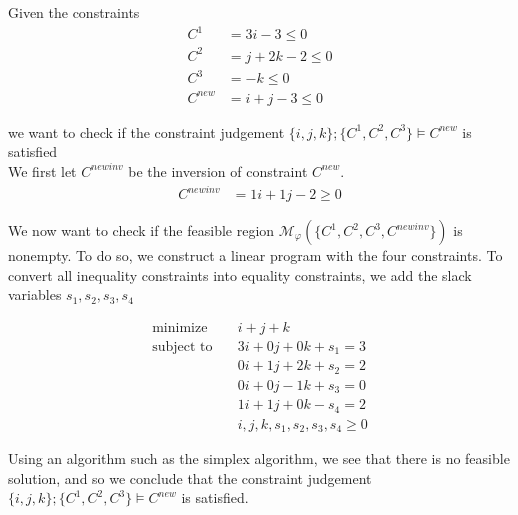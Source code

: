 \begin{example}
    Given the constraints
    \begin{align*}
        C^1 &= 3i - 3 \leq 0\\
        C^2 &= j + 2k - 2 \leq 0\\
        C^3 &= -k \leq 0\\
        C^{new} &= i + j - 3 \leq 0
    \end{align*}
    
    we want to check if the constraint judgement $\{i, j, k\};\{C^1, C^2, C^3\} \vDash C^{new}$ is satisfied\\
    
    
    We first let $C^{newinv}$ be the inversion of constraint $C^{new}$.
    \begin{align*}
        C^{newinv} &= 1i + 1j - 2 \geq 0
    \end{align*}
    
    We now want to check if the feasible region $\mathcal{M}_\varphi(\{C^1, C^2, C^3, C^{newinv}\})$ is nonempty. To do so, we construct a linear program with the four constraints. To convert all inequality constraints into equality constraints, we add the slack variables $s_1, s_2, s_3, s_4$ 
    
    \begin{align*}
        \text{minimize}&\quad i + j + k\\
        \text{subject to}&\quad 3i + 0j + 0k + s_1 = 3\\
        &\quad 0i + 1j + 2k + s_2 = 2\\
        &\quad 0i + 0j - 1k + s_3 = 0\\
        &\quad 1i + 1j + 0k - s_4 = 2\\
        &\quad i, j, k, s_1, s_2, s_3, s_4 \geq 0
    \end{align*}
    
    Using an algorithm such as the simplex algorithm, we see that there is no feasible solution, and so we conclude that the constraint judgement $\{i, j, k\};\{C^1, C^2, C^3\} \vDash C^{new}$ is satisfied.
    
    
    
    
    

\end{example}
